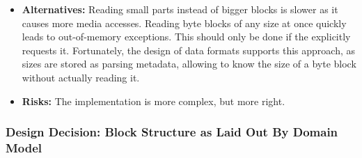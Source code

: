 \begin{itemize}
\begin{enumerate}
\end{enumerate}
	\item \textbf{Alternatives:} Reading small parts instead of bigger blocks is slower as it causes more media accesses. Reading byte blocks of any size at once quickly leads to out-of-memory exceptions. This should only be done if the \ACTORuser{} explicitly requests it. Fortunately, the design of data formats supports this approach, as sizes are stored as parsing metadata, allowing to know the size of a byte block without actually reading it.
	\item \textbf{Risks:} The implementation is more complex, but more right.
\end{itemize}


\subsubsection{Design Decision: Block Structure as Laid Out By Domain Model}
\label{sec:BlockStruct}

